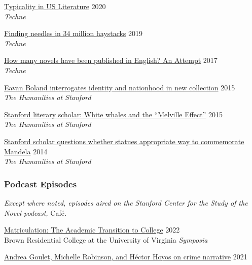 \documentclass[
  12pt,
  letterpaper,
]{article}
\begin{document}
\href{https://web.archive.org/web/20220430165427/https://litlab.stanford.edu/typicality-in-the-u-s-novel/}{Typicality
in US Literature} \hfill 2020\\
\emph{Techne}

\href{https://web.archive.org/web/20220430054802/https://litlab.stanford.edu/finding-needles-in-34-million-haystacks/}{Finding
needles in 34 million haystacks} \hfill 2019\\
\emph{Techne}

\href{https://web.archive.org/web/20220323072937/https://litlab.stanford.edu/how-many-novels-have-been-published-in-english-an-attempt/}{How
many novels have been published in English? An Attempt} \hfill 2017\\
\emph{Techne}

\href{https://web.archive.org/web/20210810123746/https://news.stanford.edu/news/2015/february/boland-country-book-022615.html}{Eavan
Boland interrogates identity and nationhood in new collection}
\hfill 2015\\
\emph{The Humanities at Stanford}

\href{https://web.archive.org/web/20210810125202/https://news.stanford.edu/news/2015/may/melville-scholar-boone-051115.html}{Stanford
literary scholar: White whales and the ``Melville Effect''}
\hfill 2015\\
\emph{The Humanities at Stanford}

\href{https://web.archive.org/web/20220611230152/https://news.stanford.edu/pr/2014/pr-mandela-statue-parker-120314.html}{Stanford
scholar questions whether statues appropriate way to commemorate
Mandela} \hfill 2014\\
\emph{The Humanities at Stanford}

\hypertarget{podcast-episodes}{%
\subsubsection{Podcast Episodes}\label{podcast-episodes}}

\emph{Except where noted, episodes aired on the Stanford Center
for the Study of the Novel podcast, }Café\emph{.}

\href{https://virginiaaudio.org/\#/symposia/}{Matriculation: The
Academic Transition to College} \hfill 2022\\
Brown Residential College at the University of
Virginia \emph{Symposia}

\href{https://web.archive.org/web/20220429010015/https://novel.stanford.edu/csn-cafe/2021/7/23/crime-narratives-with-andrea-goulet-michelle-robinson-and-hctor-hoyos-43021-je87a}{Andrea
Goulet, Michelle Robinson, and Héctor Hoyos on crime narrative}
\hfill 2021
\end{document}
